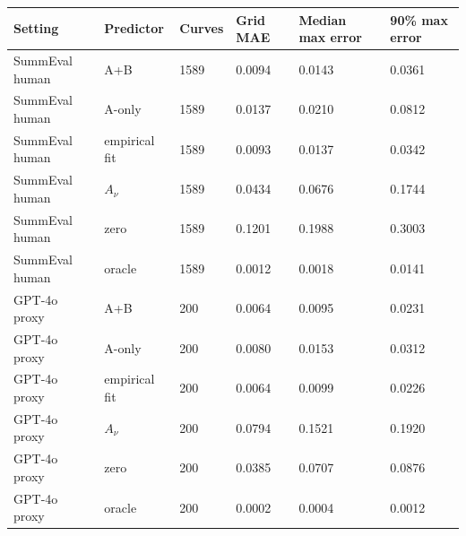 \begin{tabular}{llllll}
\toprule
Setting & Predictor & Curves & Grid MAE & Median max error & 90\% max error \\
\midrule
SummEval human & A+B & 1589 & 0.0094 & 0.0143 & 0.0361 \\
SummEval human & A-only & 1589 & 0.0137 & 0.0210 & 0.0812 \\
SummEval human & empirical fit & 1589 & 0.0093 & 0.0137 & 0.0342 \\
SummEval human & $A_\nu$ & 1589 & 0.0434 & 0.0676 & 0.1744 \\
SummEval human & zero & 1589 & 0.1201 & 0.1988 & 0.3003 \\
SummEval human & oracle & 1589 & 0.0012 & 0.0018 & 0.0141 \\
GPT-4o proxy & A+B & 200 & 0.0064 & 0.0095 & 0.0231 \\
GPT-4o proxy & A-only & 200 & 0.0080 & 0.0153 & 0.0312 \\
GPT-4o proxy & empirical fit & 200 & 0.0064 & 0.0099 & 0.0226 \\
GPT-4o proxy & $A_\nu$ & 200 & 0.0794 & 0.1521 & 0.1920 \\
GPT-4o proxy & zero & 200 & 0.0385 & 0.0707 & 0.0876 \\
GPT-4o proxy & oracle & 200 & 0.0002 & 0.0004 & 0.0012 \\
\bottomrule
\end{tabular}
